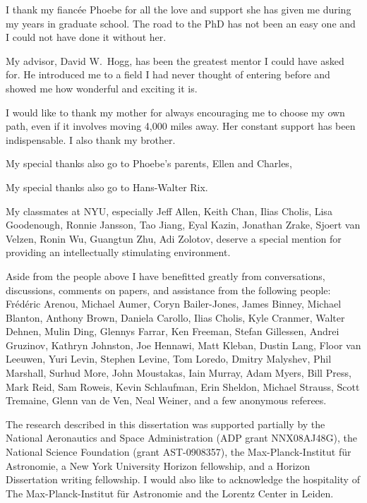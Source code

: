 I thank my fianc\'{e}e Phoebe for all the love and support she has
given me during my years in graduate school. The road to the PhD has
not been an easy one and I could not have done it without her.

My advisor, David W.~Hogg, has been the greatest mentor I could have
asked for. He introduced me to a field I had never thought of entering
before and showed me how wonderful and exciting it is. 

I would like to thank my mother for always encouraging me to choose my
own path, even if it involves moving 4,000 miles away. Her constant
support has been indispensable. I also thank my brother.

My special thanks also go to Phoebe's parents, Ellen and Charles,

My special thanks also go to Hans-Walter Rix. 

My classmates at NYU, especially Jeff Allen, Keith Chan, Ilias Cholis,
Lisa Goodenough, Ronnie Jansson, Tao Jiang, Eyal Kazin, Jonathan
Zrake, Sjoert van Velzen, Ronin Wu, Guangtun Zhu, Adi Zolotov, deserve
a special mention for providing an intellectually stimulating
environment.

Aside from the people above I have benefitted greatly from
conversations, discussions, comments on papers, and assistance from
the following people: Fr{\'e}d{\'e}ric Arenou, Michael Aumer, Coryn
Bailer-Jones, James Binney, Michael Blanton, Anthony Brown, Daniela
Carollo, Ilias Cholis, Kyle Cranmer, Walter Dehnen, Mulin Ding,
Glennys Farrar, Ken Freeman, Stefan Gillessen, Andrei Gruzinov,
Kathryn Johnston, Joe Hennawi, Matt Kleban, Dustin Lang, Floor van
Leeuwen, Yuri Levin, Stephen Levine, Tom Loredo, Dmitry Malyshev, Phil
Marshall, Surhud More, John Moustakas, Iain Murray, Adam Myers, Bill
Press, Mark Reid, Sam Roweis, Kevin Schlaufman, Erin Sheldon, Michael
Strauss, Scott Tremaine, Glenn van de Ven, Neal Weiner, and a few
anonymous referees.

The research described in this dissertation was supported partially by
the National Aeronautics and Space Administration (ADP grant
NNX08AJ48G), the National Science Foundation (grant AST-0908357), the
Max-Planck-Institut f\"ur Astronomie, a New York University Horizon
fellowship, and a Horizon Dissertation writing fellowship. I would
also like to acknowledge the hospitality of The Max-Planck-Institut
f\"ur Astronomie and the Lorentz Center in Leiden.



